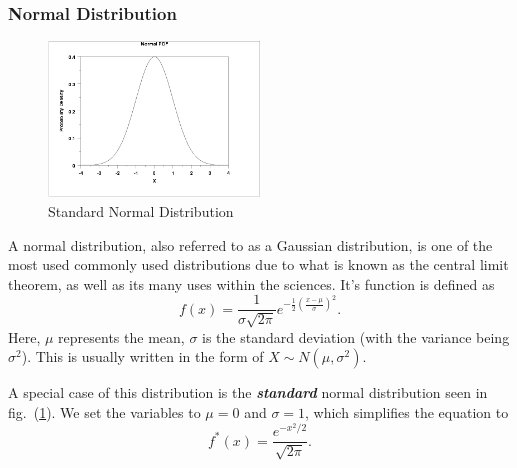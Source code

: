 \documentclass{article}
\begin{document}
\subsubsection{Normal Distribution}
\begin{figure}[H]
\centering
\includegraphics[width=0.5\textwidth]{images/norpdf.png}
\caption{Standard Normal Distribution} \label{fig:stand_norm_dis}
\end{figure}
A normal distribution, also referred to as a Gaussian distribution, is one of the most used commonly used distributions due to what is known as the central limit theorem, as well as its many uses within the sciences. It's function is defined as
\begin{equation}
    f(x) = \frac{1}{\sigma\sqrt{2\pi}}e^{-\frac{1}{2}\left( \frac{x-\mu}{\sigma} \right)^2}.
\end{equation}
Here, $\mu$ represents the mean, $\sigma$ is the standard deviation (with the variance being $\sigma^2$). This is usually written in the form of $X\sim N(\mu,\sigma^2)$.

A special case of this distribution is the \textbf{\textit{standard}} normal distribution seen in fig.~(\ref{fig:stand_norm_dis}). We set the variables to $\mu=0$ and $\sigma=1$, which simplifies the equation to
\begin{equation}
    f^*(x) = \frac{e^{-x^2/2}}{\sqrt{2\pi}}.
\end{equation}
\end{document}
